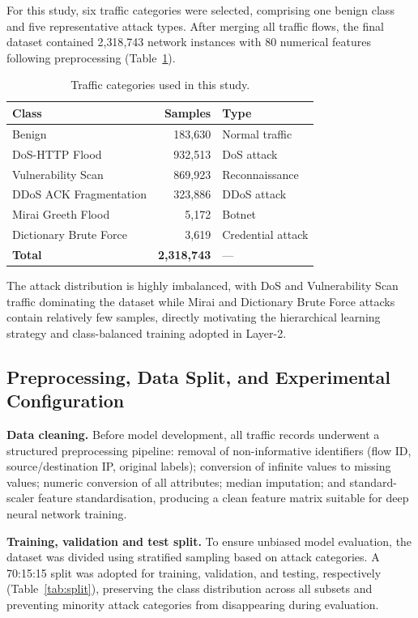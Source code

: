 \documentclass{llncs}
\begin{document}
For this study, six traffic categories were selected, comprising one benign class and five representative attack types. After merging all traffic flows, the final dataset contained 2{,}318{,}743 network instances with 80 numerical features following preprocessing (Table~\ref{tab:traffic}).

\begin{table}[!htb]
\centering
\caption{Traffic categories used in this study.}
\label{tab:traffic}
\small
\begin{tabular}{lrl}
\toprule
\textbf{Class} & \textbf{Samples} & \textbf{Type} \\
\midrule
Benign                  & 183{,}630   & Normal traffic \\
DoS-HTTP Flood          & 932{,}513   & DoS attack \\
Vulnerability Scan      & 869{,}923   & Reconnaissance \\
DDoS ACK Fragmentation  & 323{,}886   & DDoS attack \\
Mirai Greeth Flood      & 5{,}172     & Botnet \\
Dictionary Brute Force  & 3{,}619     & Credential attack \\
\midrule
\textbf{Total}          & \textbf{2{,}318{,}743} & --- \\
\bottomrule
\end{tabular}
\end{table}

The attack distribution is highly imbalanced, with DoS and Vulnerability Scan traffic dominating the dataset while Mirai and Dictionary Brute Force attacks contain relatively few samples, directly motivating the hierarchical learning strategy and class-balanced training adopted in Layer-2.

\subsection{Preprocessing, Data Split, and Experimental Configuration}

\textbf{Data cleaning.} Before model development, all traffic records underwent a structured preprocessing pipeline: removal of non-informative identifiers (flow ID, source/destination IP, original labels); conversion of infinite values to missing values; numeric conversion of all attributes; median imputation; and standard-scaler feature standardisation, producing a clean feature matrix suitable for deep neural network training.

\textbf{Training, validation and test split.} To ensure unbiased model evaluation, the dataset was divided using stratified sampling based on attack categories. A 70:15:15 split was adopted for training, validation, and testing, respectively (Table~\ref{tab:split}), preserving the class distribution across all subsets and preventing minority attack categories from disappearing during evaluation.
\end{document}

